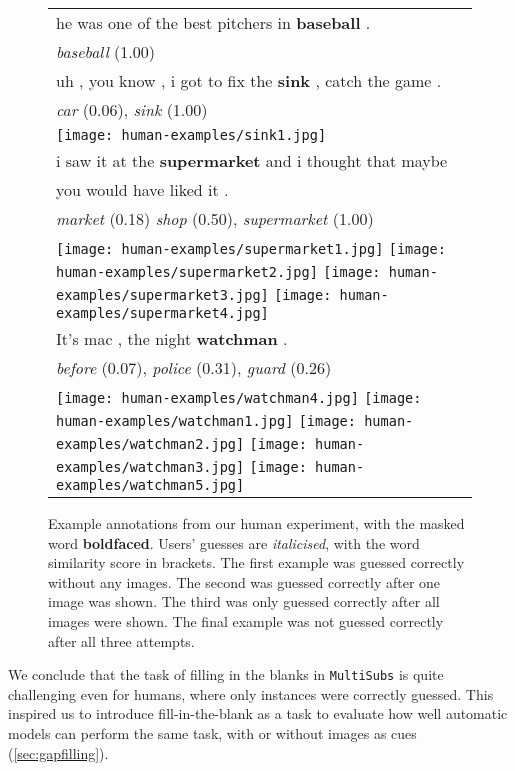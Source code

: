 \documentclass[twocolumn]{svjour3}          \smartqed  \usepackage{graphicx}
\newcommand{\multisubs}{\texttt{MultiSubs}\xspace}
\begin{document}
\begin{figure}[t]
    \centering
\begin{tabular}{l}
             he was one of the best pitchers in  \textbf{baseball} .\\
        \textit{baseball} (1.00)\\
         \midrule
         uh , you know , i got to fix the \textbf{sink} , catch the game .\\
         \textit{car} (0.06), \textit{sink} (1.00) \\
         \texttt{[image: human-examples/sink1.jpg]} \\        
         \midrule
         i saw it at the \textbf{supermarket} and i thought that maybe \\you would have liked it .\\
         \textit{market} (0.18) \textit{shop} (0.50), \textit{supermarket} (1.00)\\   
         \texttt{[image: human-examples/supermarket1.jpg]}     
         \texttt{[image: human-examples/supermarket2.jpg]}             
         \texttt{[image: human-examples/supermarket3.jpg]} \texttt{[image: human-examples/supermarket4.jpg]} \\ \midrule
         It's mac , the night \textbf{watchman} .\\
         \textit{before} (0.07), \textit{police} (0.31), \textit{guard} (0.26)\\
         \texttt{[image: human-examples/watchman4.jpg]}
         \texttt{[image: human-examples/watchman1.jpg]}
         \texttt{[image: human-examples/watchman2.jpg]}         
         \texttt{[image: human-examples/watchman3.jpg]}
         \texttt{[image: human-examples/watchman5.jpg]}         
    \end{tabular}
\caption{Example annotations from our human experiment, with the masked word \textbf{boldfaced}. Users' guesses are \textit{italicised}, with the word similarity score in brackets. The first example was guessed correctly without any images. The second was guessed correctly after one image was shown. The third  was only guessed correctly after all images were shown. The final example was not guessed correctly after all three attempts.}
    \label{fig:human-example}
\end{figure}

We conclude that the task of filling in the blanks in \multisubs is quite challenging even for humans, where only  instances were correctly guessed. This inspired us to introduce fill-in-the-blank as a task to evaluate how well automatic models can perform the same task, with or without images as cues (\ref{sec:gapfilling}).
\end{document}

